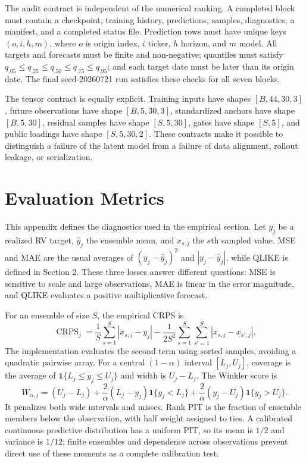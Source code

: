 \documentclass[11pt]{article}
\begin{document}
The audit contract is independent of the numerical ranking. A completed block must contain a checkpoint, training history, predictions, samples, diagnostics, a manifest, and a completed status file. Prediction rows must have unique keys $(o,i,h,m)$, where $o$ is origin index, $i$ ticker, $h$ horizon, and $m$ model. All targets and forecasts must be finite and non-negative; quantiles must satisfy $q_{.05}\leq q_{.25}\leq q_{.50}\leq q_{.75}\leq q_{.95}$; and each target date must be later than its origin date. The final seed-20260721 run satisfies these checks for all seven blocks.

The tensor contract is equally explicit. Training inputs have shapes $[B,44,30,3]$, future observations have shape $[B,5,30,3]$, standardized anchors have shape $[B,5,30]$, residual samples have shape $[S,5,30]$, gates have shape $[S,5]$, and public loadings have shape $[S,5,30,2]$. These contracts make it possible to distinguish a failure of the latent model from a failure of data alignment, rollout leakage, or serialization.

\section{Evaluation Metrics}
This appendix defines the diagnostics used in the empirical section. Let $y_j$ be a realized RV target, $\widehat y_j$ the ensemble mean, and $x_{s,j}$ the $s$th sampled value. MSE and MAE are the usual averages of $(y_j-\widehat y_j)^2$ and $|y_j-\widehat y_j|$, while QLIKE is defined in Section 2. These three losses answer different questions: MSE is sensitive to scale and large observations, MAE is linear in the error magnitude, and QLIKE evaluates a positive multiplicative forecast.

For an ensemble of size $S$, the empirical CRPS is
\begin{equation}
 \operatorname{CRPS}_j=\frac1S\sum_{s=1}^{S}|x_{s,j}-y_j|-\frac{1}{2S^2}\sum_{s=1}^{S}\sum_{s'=1}^{S}|x_{s,j}-x_{s',j}|.
\end{equation}
The implementation evaluates the second term using sorted samples, avoiding a quadratic pairwise array. For a central $(1-\alpha)$ interval $[L_j,U_j]$, coverage is the average of $\mathbf1\{L_j\leq y_j\leq U_j\}$ and width is $U_j-L_j$. The Winkler score is
\begin{equation}
 W_{\alpha,j}=(U_j-L_j)+\frac{2}{\alpha}(L_j-y_j)\mathbf1\{y_j<L_j\}+\frac{2}{\alpha}(y_j-U_j)\mathbf1\{y_j>U_j\}.
\end{equation}
It penalizes both wide intervals and misses. Rank PIT is the fraction of ensemble members below the observation, with half weight assigned to ties. A calibrated continuous predictive distribution has a uniform PIT, so its mean is $1/2$ and variance is $1/12$; finite ensembles and dependence across observations prevent direct use of these moments as a complete calibration test.
\end{document}
